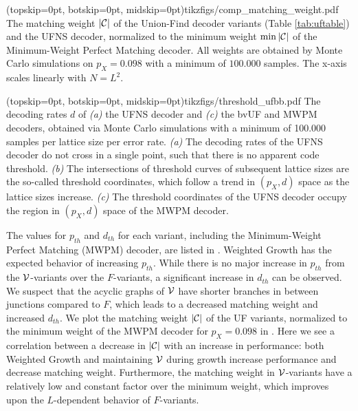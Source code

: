 \Figure[b!](topskip=0pt, botskip=0pt, midskip=0pt){tikzfigs/comp_matching_weight.pdf}{
  The matching weight $\lvert\mathcal{C}\rvert$ of the Union-Find decoder variants (Table \ref{tab:uftable}) and the UFNS decoder, normalized to the minimum weight $\min{\lvert\mathcal{C}\rvert}$ of the Minimum-Weight Perfect Matching decoder. All weights are obtained by Monte Carlo simulations on $p_X=0.098$ with a minimum of $100.000$ samples. The x-axis scales linearly with $N = L^2$. \label{comp_weight}}

\Figure[htb](topskip=0pt, botskip=0pt, midskip=0pt){tikzfigs/threshold_ufbb.pdf}{
  The decoding rates $d$ of \emph{(a)} the UFNS decoder and \emph{(c)} the bvUF and MWPM decoders, obtained via Monte Carlo simulations with a minimum of 100.000 samples per lattice size per error rate. \emph{(a)} The decoding rates of the UFNS decoder do not cross in a single point, such that there is no apparent code threshold. \emph{(b)} The intersections of threshold curves of subsequent lattice sizes are the so-called threshold coordinates, which follow a trend in $(p_X, d)$ space as the lattice sizes increase. \emph{(c)} The threshold coordinates of the UFNS decoder occupy the region in $(p_X, d)$ space of the MWPM decoder. \label{threshold_ufbb}}

The values for $p_{th}$ and $d_{th}$ for each variant, including the Minimum-Weight Perfect Matching (MWPM) decoder, are listed in . Weighted Growth has the expected behavior of increasing $p_{th}$. While there is no major increase in $p_{th}$ from the $\mathcal{V}$-variants over the $F$-variants, a significant increase in $d_{th}$ can be observed. We suspect that the acyclic graphs of $\mathcal{V}$ have shorter branches in between junctions compared to $F$, which leads to a decreased matching weight and increased $d_{th}$. We plot the matching weight $\lvert\mathcal{C}\rvert$ of the UF variants, normalized to the minimum weight of the MWPM decoder for $p_X = 0.098$ in . Here we see a correlation between a decrease in $\lvert\mathcal{C}\rvert$ with an increase in performance: both Weighted Growth and maintaining $\mathcal{V}$ during growth increase performance and decrease matching weight. Furthermore, the matching weight in $\mathcal{V}$-variants have a relatively low and constant factor over the minimum weight, which improves upon the $L$-dependent behavior of $F$-variants.

